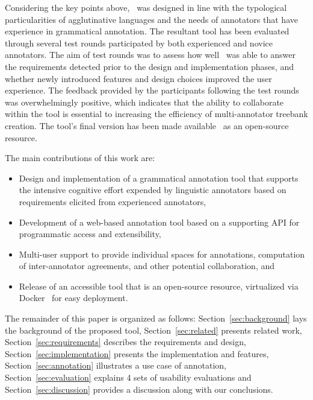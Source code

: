 Considering the key points above, \boatvtwo\ was designed in line with the typological particularities of agglutinative languages and the needs of annotators that have experience in grammatical annotation.
The resultant tool has been evaluated through several test rounds participated by both experienced and novice annotators.
The aim of test rounds was to assess how well \boatvtwo\ was able to answer the requirements detected prior to the design and implementation phases, and whether newly introduced features and design choices improved the user experience.
The feedback provided by the participants following the test rounds was overwhelmingly positive, which indicates that the ability to collaborate within the tool is essential to increasing the efficiency of multi-annotator treebank creation.
The tool's final version has been made available~\cite{anon} as an open-source resource.

The main contributions of this work are:
\begin{itemize}
\setlength\itemsep{0em}
        \item Design and implementation of a grammatical annotation tool that supports the intensive cognitive effort expended by linguistic annotators based on requirements elicited from experienced annotators,
        \item Development of a web-based annotation tool based on a supporting API for programmatic access and extensibility,
        \item Multi-user support to provide individual spaces for annotations, computation of inter-annotator agreements, and other potential collaboration, and
        \item Release of an accessible tool that is an open-source resource, virtualized via Docker~\cite{docker} for easy deployment.
\end{itemize}

The remainder of this paper is organized as follows:
Section~\ref{sec:background} lays the background of the proposed tool,
Section~\ref{sec:related} presents related work,
Section~\ref{sec:requirements} describes the requirements and design,
Section~\ref{sec:implementation} presents the implementation and features,
Section~\ref{sec:annotation} illustrates a use case of annotation,
Section~\ref{sec:evaluation} explains 4 sets of usability evaluations and
Section~\ref{sec:discussion} provides a discussion along with our conclusions.
